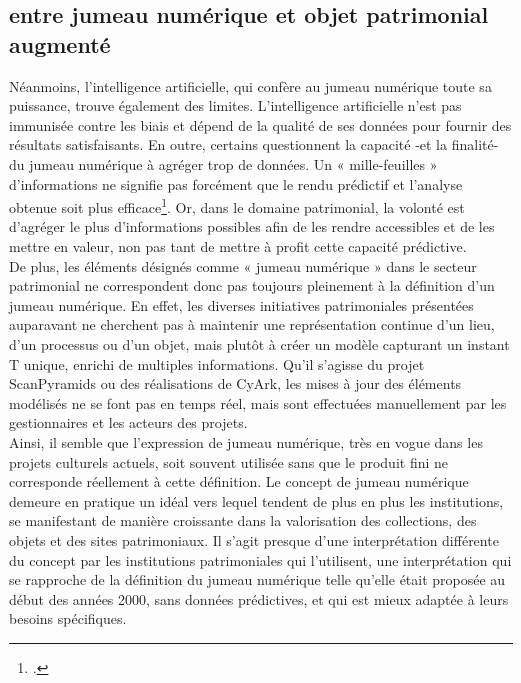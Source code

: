         \subsection{entre jumeau numérique et objet patrimonial augmenté}

Néanmoins, l'intelligence artificielle, qui confère au jumeau numérique toute sa puissance, trouve également des limites. L'intelligence artificielle n'est pas immunisée contre les biais et dépend de la qualité de ses données pour fournir des résultats satisfaisants. En outre, certains questionnent la capacité -et la finalité- du jumeau numérique à agréger trop de données. Un « mille-feuilles » d’informations ne signifie pas forcément que le rendu prédictif et l'analyse obtenue soit plus efficace\footcite{EssorJumeauxNumeriques2024}. Or, dans le domaine patrimonial, la volonté est d’agréger le plus d’informations possibles afin de les rendre accessibles et de les mettre en valeur, non pas tant de mettre à profit cette capacité prédictive.\\  

De plus, les éléments désignés comme « jumeau numérique » dans le secteur patrimonial ne correspondent donc pas toujours pleinement à la définition d'un jumeau numérique. En effet, les diverses initiatives patrimoniales présentées auparavant ne cherchent pas à maintenir une représentation continue d’un lieu, d’un processus ou d'un objet, mais plutôt à créer un modèle capturant un instant T unique, enrichi de multiples informations. Qu’il s’agisse du projet ScanPyramids ou des réalisations de CyArk, les mises à jour des éléments modélisés ne se font pas en temps réel, mais sont effectuées manuellement par les gestionnaires et les acteurs des projets.\\

 Ainsi, il semble que l’expression de jumeau numérique, très en vogue dans les projets culturels actuels, soit souvent utilisée sans que le produit fini ne corresponde réellement à cette définition. Le concept de jumeau numérique demeure en pratique un idéal vers lequel tendent de plus en plus les institutions, se manifestant de manière croissante dans la valorisation des collections, des objets et des sites patrimoniaux. Il s'agit presque d'une interprétation différente du concept par les institutions patrimoniales qui l'utilisent, une interprétation qui se rapproche de la définition du jumeau numérique telle qu'elle était proposée au début des années 2000, sans données prédictives, et qui est mieux adaptée à leurs besoins spécifiques. \\

